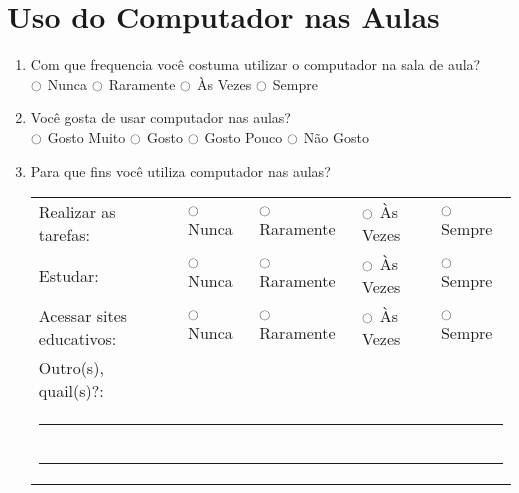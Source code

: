 \section{Uso do Computador nas Aulas}
\begin{enumerate}
\item Com que frequencia você costuma utilizar o computador na sala de aula? \\
$\ocircle$ Nunca  $\ocircle$ Raramente  $\ocircle$ Às Vezes  $\ocircle$ Sempre \\

\item Você gosta de usar computador nas aulas? \\
$\ocircle$ Gosto Muito $\ocircle$ Gosto $\ocircle$ Gosto Pouco $\ocircle$ Não Gosto

\item Para que fins você utiliza computador nas aulas? \\
\begin{tabular}{lllll}
	Realizar as tarefas: & $\ocircle$ Nunca & $\ocircle$ Raramente & $\ocircle$ Às Vezes & $\ocircle$ Sempre \\
	Estudar: & $\ocircle$ Nunca & $\ocircle$ Raramente & $\ocircle$ Às Vezes & $\ocircle$ Sempre \\
	Acessar sites educativos: & $\ocircle$ Nunca & $\ocircle$ Raramente & $\ocircle$ Às Vezes & $\ocircle$ Sempre \\
	Outro(s), quail(s)?: \\
	\multicolumn{5}{l}{\noindent\rule{\textwidth}{0.4pt}} \\
	\multicolumn{5}{l}{\noindent\rule{\textwidth}{0.4pt}} \\
\end{tabular}

\end{enumerate}

